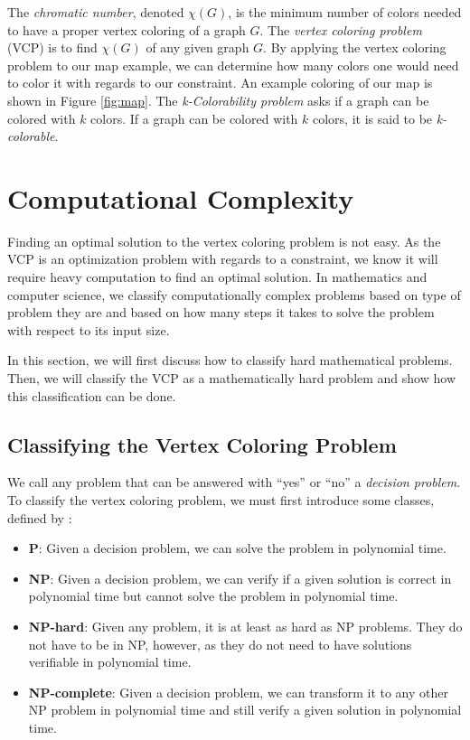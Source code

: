 \documentclass{article}
\theoremstyle{definition}
\begin{document}
The \emph{chromatic number}, denoted $\chi(G)$, is the minimum number of colors needed to have a proper vertex coloring of a graph $G$. The \emph{vertex coloring problem} (VCP) is to find $\chi(G)$ of any given graph $G$. By applying the vertex coloring problem to our map example, we can determine how many colors one would need to color it with regards to our constraint. An example coloring of our map is shown in Figure \ref{fig:map}. The \emph{k-Colorability problem} asks if a graph can be colored with $k$ colors. If a graph can be colored with $k$ colors, it is said to be \emph{k-colorable}.

\section{Computational Complexity}\label{sec:complexity}
Finding an optimal solution to the vertex coloring problem is not easy. As the VCP is an optimization problem with regards to a constraint, we know it will require heavy computation to find an optimal solution. In mathematics and computer science, we classify computationally complex problems based on type of problem they are and based on how many steps it takes to solve the problem with respect to its input size.

In this section, we will first discuss how to classify hard mathematical problems. Then, we will classify the VCP as a mathematically hard problem and show how this classification can be done.

\subsection{Classifying the Vertex Coloring Problem}
We call any problem that can be answered with ``yes'' or ``no'' a \emph{decision problem}. To classify the vertex coloring problem, we must first introduce some classes, defined by \citet{moret}:

\begin{itemize}
  \item \textbf{P}: Given a decision problem, we can solve the problem in polynomial time.
  \item \textbf{NP}: Given a decision problem, we can verify if a given solution is correct in polynomial time but cannot solve the problem in polynomial time.
  \item \textbf{NP-hard}: Given any problem, it is at least as hard as NP problems. They do not have to be in NP, however, as they do not need to have solutions verifiable in polynomial time.
  \item \textbf{NP-complete}: Given a decision problem, we can transform it to any other NP problem in polynomial time and still verify a given solution in polynomial time.
\end{itemize}
\end{document}
